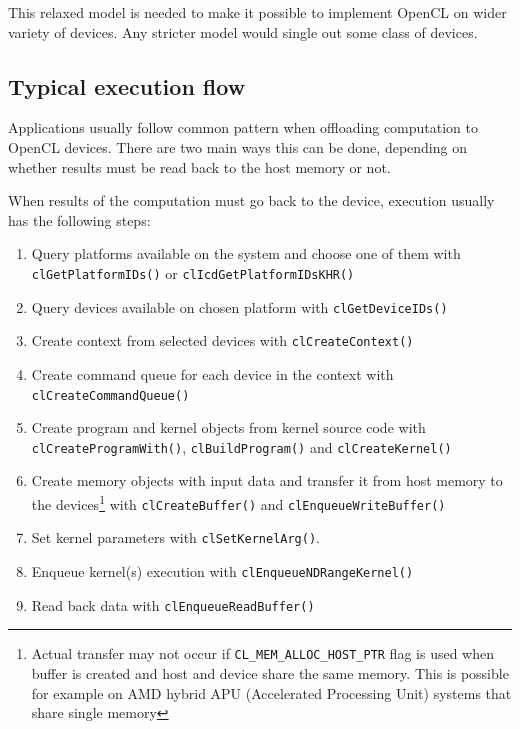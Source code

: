 This relaxed model is needed to make it possible to implement OpenCL on wider
variety of devices. Any stricter model would single out some class of devices.

\subsection{Typical execution flow}
Applications usually follow common pattern when offloading computation to OpenCL
devices. There are two main ways this can be done, depending on whether results
must be read back to the host memory or not.

When results of the computation must go back to the device, execution usually
has the following steps:

\begin{enumerate}
  \item Query platforms available on the system and choose one of them with
    \texttt{clGetPlatformIDs()} or \texttt{clIcd\-Get\-Platform\-IDsKHR()}
  \item Query devices available on chosen platform with \texttt{clGet\-DeviceIDs()}
  \item Create context from selected devices with \texttt{clCreate\-Context()}
  \item Create command queue for each device in the context with
    \texttt{clCreate\-Command\-Queue()}
  \item Create program and kernel objects from kernel source code with
    \texttt{clCreate\-Program\-With()}, \texttt{clBuild\-Program()} and
    \texttt{clCreate\-Kernel()}
  \item Create memory objects with input data and transfer it from host memory
    to the devices\footnote{Actual transfer may not occur if
      \texttt{CL\_MEM\_ALLOC\_HOST\_PTR} flag is used when buffer is created and
      host and device share the same memory. This is possible for example on
    AMD hybrid APU (Accelerated Processing Unit) systems that share single
    memory} with
    \texttt{clCreate\-Buffer()} and \texttt{clEnqueue\-Write\-Buffer()}
  \item Set kernel parameters with \texttt{clSet\-KernelArg()}.
  \item Enqueue kernel(s) execution with \texttt{clEnqueue\-NDRange\-Kernel()}
  \item Read back data with \texttt{clEnqueue\-Read\-Buffer()}
\end{enumerate}

